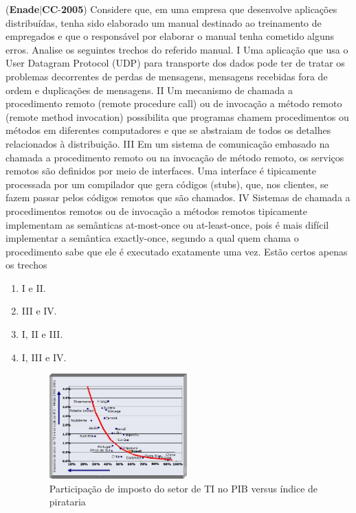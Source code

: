 \documentclass{exam}
\begin{document}
\begin{questions}
\question (\textbf{Enade}$|$\textbf{CC}-\textbf{2005}) Considere que, em uma empresa que desenvolve aplicações
distribuídas, tenha sido elaborado um manual destinado ao
treinamento de empregados e que o responsável por elaborar o
manual tenha cometido alguns erros. Analise os seguintes
trechos do referido manual.
I Uma aplicação que usa o User Datagram Protocol (UDP)
para transporte dos dados pode ter de tratar os problemas
decorrentes de perdas de mensagens, mensagens recebidas
fora de ordem e duplicações de mensagens.
II Um mecanismo de chamada a procedimento remoto (remote
procedure call) ou de invocação a método remoto (remote
method invocation) possibilita que programas chamem
procedimentos ou métodos em diferentes computadores e
que se abstraiam de todos os detalhes relacionados à
distribuição.
III Em um sistema de comunicação embasado na chamada a
procedimento remoto ou na invocação de método remoto, os
serviços remotos são definidos por meio de interfaces. Uma
interface é tipicamente processada por um compilador que
gera códigos (stubs), que, nos clientes, se fazem passar pelos
códigos remotos que são chamados.
IV Sistemas de chamada a procedimentos remotos ou de
invocação a métodos remotos tipicamente implementam as
semânticas at-most-once ou at-least-once, pois é mais difícil
implementar a semântica exactly-once, segundo a qual quem
chama o procedimento sabe que ele é executado exatamente
uma vez.
Estão certos apenas os trechos
	\begin{enumerate}[label=\alph*)]
		\item  I e II.
		\item  III e IV.
		\item  I, II e III.
		\item  I, III e IV.
\begin{figure}[H]
	\begin{center}
		\includegraphics[width=0.5\textwidth]{CIENCIA_DA_COMPUTACAO_Prova2005-utf8_figuras/fig-0033.jpg}
		\caption{Participação de imposto do setor de TI no PIB versus índice de pirataria}
	\end{center}

\end{figure}
\end{enumerate}
\end{questions}
\end{document}
